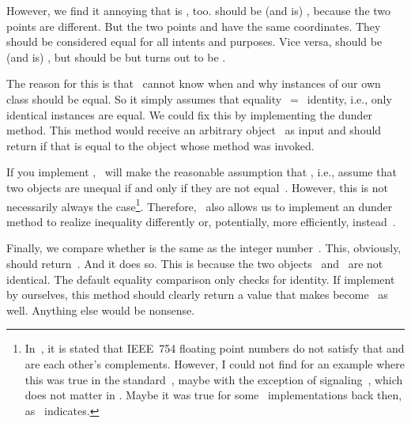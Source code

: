 However, we find it annoying that \pythonIdx{==} is , too.
 should be (and is) , because the two points are different.
But the two points  and  have the same coordinates.
They should be considered equal for all intents and purposes.
Vice versa,  should be (and is) , but  should be  but turns out to be .

The reason for this is that \python\ cannot know when and why instances of our own class should be equal.
So it simply assumes that equality~$=$~identity, i.e., only identical instances are equal.
We could fix this by implementing the  dunder method.
This method would receive an arbitrary object~ as input and should return  if that is equal to the object whose method was invoked.

If you implement , \python\ will make the reasonable assumption that \pythonIdx{==}, i.e., assume that two objects are unequal if and only if they are not equal~\cite{PEP207}.
However, this is not necessarily always the case\footnote{%
In~\cite{PEP207}, it is stated that IEEE~754 floating point numbers do not satisfy that \pythonilIdx{==} and \pythonil{!=} are each other's complements. %
However, I could not find for an example where this was true in the standard~\cite{IEEE2019ISFFPA}, maybe with the exception of signaling~, which does not matter in \python. %
Maybe it was true for some \python\ implementations back then, as~\cite{PEP754} indicates.%
}. %
Therefore, \python\ also allows us to implement an  dunder method to realize inequality differently or, potentially, more efficiently, instead~\cite{PEP207}.

Finally, we compare whether  is the same as the integer number~.
This, obviously, should return~.
And it does so.
This is because the two objects~ and~ are not identical.
The default equality comparison only checks for identity.
If implement  by ourselves, this method should clearly return a value that makes  become~ as well.
Anything else would be nonsense.

%
%
%
%
%

